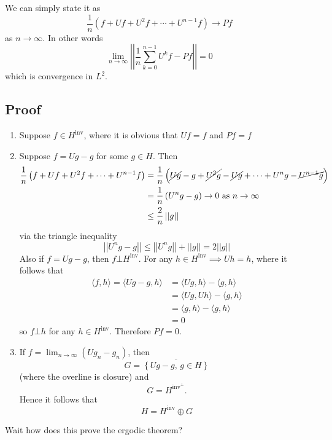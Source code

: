 \documentclass{article}
\begin{document}
We can simply state it as 
\[
\frac{1}{n}\left(f+Uf+U^2f+\cdots+U^{n-1}f\right)\to Pf
\]
as $n\to \infty$. In other words 
\[
\lim_{n\to\infty}\left|\left| \frac{1}{n} \sum_{k=0}^{n-1}U^k f - Pf \right|\right|=0
\]
which is convergence in $L^2$.

\subsection{Proof}

\begin{enumerate}
    \item[(1)] Suppose $f\in H^{\text{inv}}$, where it is obvious that $Uf=f$ and $Pf=f$
    \item[(2)] Suppose $f=Ug-g$ for some $g\in H$. Then \begin{align*}
        \frac{1}{n}\left(f+Uf+U^2f+\cdots+U^{n-1}f\right) &= \frac{1}{n}\left(\cancel{Ug}-g + \cancel{U^2g}-\cancel{Ug}+\cdots+U^ng-\cancel{U^{n-1}g}\right)\\
        &=\frac{1}{n} \left(U^n g - g\right)\to 0 \text{ as } n\to\infty\\
        &\leq \frac{2}{n}\left|\left| g \right|\right|
    \end{align*} via the triangle inequality \[ \left|\left|U^ng-g\right|\right| \leq \left|\left|U^n g\right|\right| + \left|\left|g\right|\right| = 2 \left|\left| g \right|\right|\] Also if $f=Ug-g$, then $f\bot H^{\text{inv}}$. For any $h\in H^{\text{inv}}\implies Uh=h$, where it follows that \begin{align*}
        \langle f,h \rangle = \langle Ug-g,h \rangle &= \langle Ug, h \rangle - \langle g, h \rangle\\
        &= \langle Ug, Uh \rangle - \langle g, h \rangle\\
        &= \langle g, h \rangle - \langle g, h \rangle\\
        &=0
    \end{align*} so $f\bot h$ for any $h\in H^{\text{inv}}$. Therefore $Pf=0$.
    \item[(3)] If $f=\lim_{n\to\infty}\left(U g_n - g_n\right)$, then \[G=\overline{\left\{Ug -g,\, g\in H\right\}}\] (where the overline is closure) and \[ G= H^{\text{inv}^\bot}.\] Hence it follows that \[H=H^{\text{inv}}\oplus G\]
\end{enumerate}
Wait how does this prove the ergodic theorem?
\end{document}
